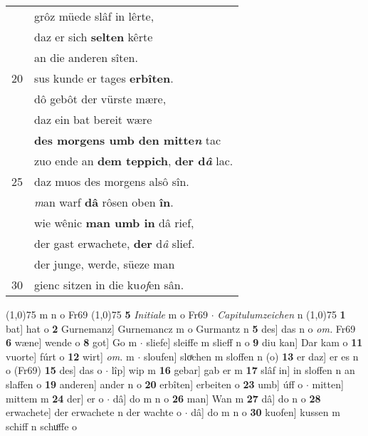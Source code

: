 \documentclass[8pt,a4paper,notitlepage]{article}
\begin{document}
\begin{table}[ht]
\begin{minipage}[t]{0.5\linewidth}
\begin{tabular}{rl}
 & grôz müede slâf in lêrte,\\ 
 & daz er sich \textbf{selten} kêrte\\ 
 & an die anderen sîten.\\ 
20 & sus kunde er tages \textbf{erbîten}.\\ 
 & dô gebôt der vürste mære,\\ 
 & daz ein bat bereit wære\\ 
 & \textbf{des morgens umb den mitte\textit{n}} tac\\ 
 & zuo ende an \textbf{dem teppich}, \textbf{der d\textit{â}} lac.\\ 
25 & daz muos des morgens alsô sîn.\\ 
 & \textit{m}an warf \textbf{dâ} rôsen oben \textbf{în}.\\ 
 & wie wênic \textbf{man umb in} dâ rief,\\ 
 & der gast erwachete, \textbf{der} d\textit{â} slief.\\ 
 & der junge, werde, süeze man\\ 
30 & gienc sitzen in die ku\textit{of}en sân.\\ 
\end{tabular}
\scriptsize
\line(1,0){75} \newline
m n o Fr69 \newline
\line(1,0){75} \newline
\textbf{5} \textit{Initiale} m o Fr69   $\cdot$ \textit{Capitulumzeichen} n  \newline
\line(1,0){75} \newline
\textbf{1} bat] hat o \textbf{2} Gurnemanz] Gurnemancz m o Gurmantz n \textbf{5} des] das n o \textit{om.} Fr69 \textbf{6} wæne] wende o \textbf{8} got] Go m  $\cdot$ sliefe] sleiffe m slieff n o \textbf{9} diu kan] Dar kam o \textbf{11} vuorte] fúrt o \textbf{12} wirt] \textit{om.} m  $\cdot$ sloufen] sloͯchen m sloffen n (o) \textbf{13} er daz] er es n o (Fr69) \textbf{15} des] das o  $\cdot$ lîp] wip m \textbf{16} gebar] gab er m \textbf{17} slâf in] in sloffen n an slaffen o \textbf{19} anderen] ander n o \textbf{20} erbîten] erbeiten o \textbf{23} umb] úff o  $\cdot$ mitten] mittem m \textbf{24} der] er o  $\cdot$ dâ] do m n o \textbf{26} man] Wan m \textbf{27} dâ] do n o \textbf{28} erwachete] der erwachete n der wachte o  $\cdot$ dâ] do m n o \textbf{30} kuofen] kussen m schiff n schuͦffe o \newline
\end{minipage}
\end{table}
\newpage
\end{document}
